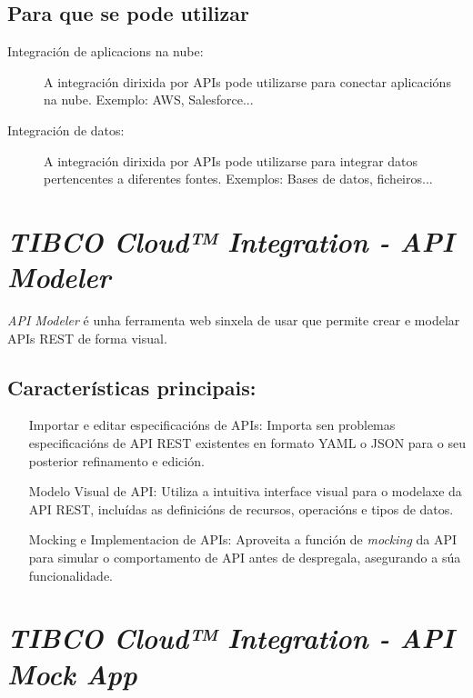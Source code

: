 \subsection{Para que se pode utilizar}

\begin{description}
    \item[Integración de aplicacions na nube:] A integración dirixida por APIs pode utilizarse para conectar aplicacións na nube. Exemplo: AWS, Salesforce...
    
    \item[Integración de datos:] A integración dirixida por APIs pode utilizarse para integrar datos pertencentes a diferentes fontes. Exemplos: Bases de datos, ficheiros...
\end{description}

\section{\textit{TIBCO Cloud™ Integration - API Modeler}}

\textit{API Modeler} é unha ferramenta web sinxela de usar que permite crear e modelar APIs REST de forma visual.

\subsection{Características principais:}

\begin{itemize}
    \item[Importar e editar especificacións de APIs:] Importa sen problemas especificacións de API REST existentes en formato YAML o JSON para o seu posterior refinamento e edición.
    
    \item[Modelo Visual de API:] Utiliza a intuitiva interface visual para o modelaxe da API REST, incluídas as definicións de recursos, operacións e tipos de datos.
    
    \item[Mocking e Implementacion de APIs:] Aproveita a función de \textit{mocking} da API para simular o comportamento de API antes de despregala, asegurando a súa funcionalidade.
\end{itemize}

\section{\textit{TIBCO Cloud™ Integration - API Mock App}}

